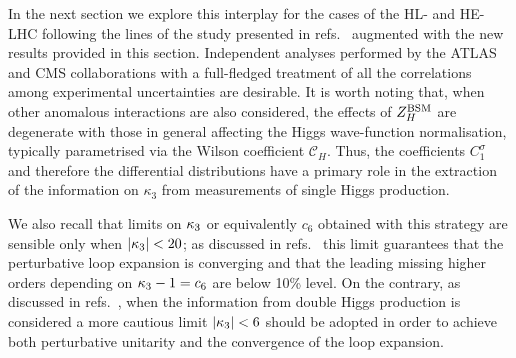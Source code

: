 In the next section we explore this interplay for the cases of the HL- and HE-LHC following the lines of the study presented in refs.~\cite{DiVita:2017eyz} augmented with the new results provided in this section. Independent analyses performed by the ATLAS and CMS collaborations with a full-fledged treatment of all the correlations among experimental uncertainties are desirable. It is worth noting that, when other anomalous interactions are also considered, the effects of  $Z_H^{\rm BSM}$ are degenerate with those in general affecting the Higgs wave-function normalisation, typically parametrised via the Wilson coefficient $\mathcal{C}_{H}$. Thus, the coefficients $C_1^{\sigma}$ and therefore the differential distributions have a primary role in the extraction of the information on $\kappa_3$ from measurements of  single Higgs production.

We also recall that limits on $\kappa_{3}$ or equivalently $c_6$ obtained with this strategy are sensible only when $|\kappa_{3}|<20$; as discussed in refs.~\cite{Degrassi:2016wml} this limit guarantees that the perturbative loop expansion is converging and that the leading missing higher orders depending on $\kappa_{3}-1=c_6$ are below 10\% level. On the contrary, as discussed in refs.~\cite{DiLuzio:2017tfn, Maltoni:2018ttu}, when the information from double Higgs production is considered a more cautious limit $|\kappa_{3}|<6$ should be adopted in order to achieve both perturbative unitarity and the convergence of the loop expansion.
 









%
%
